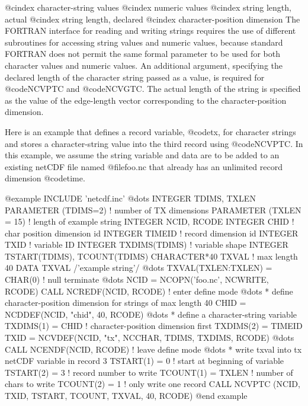 @cindex character-string values
@cindex numeric values
@cindex string length, actual
@cindex string length, declared
@cindex character-position dimension
The FORTRAN interface for reading and writing strings requires the use
of different subroutines for accessing string values and numeric values,
because standard FORTRAN does not permit the same formal parameter to be
used for both character values and numeric values.  An additional
argument, specifying the declared length of the character string passed
as a value, is required for @code{NCVPTC} and @code{NCVGTC}.  The actual
length of the string is specified as the value of the
edge-length vector corresponding to the character-position dimension.

Here is an example that defines a record variable, @code{tx}, for
character strings and stores a character-string value into the third
record using @code{NCVPTC}.  In this example, we assume the string
variable and data are to be added to an existing netCDF file named
@file{foo.nc} that already has an unlimited record dimension
@code{time}.

@example
      INCLUDE 'netcdf.inc'
         @dots{}
      INTEGER   TDIMS, TXLEN
      PARAMETER (TDIMS=2)    ! number of TX dimensions
      PARAMETER (TXLEN = 15) ! length of example string
      INTEGER  NCID, RCODE
      INTEGER  CHID          ! char position dimension id
      INTEGER  TIMEID        ! record dimension id
      INTEGER  TXID          ! variable ID
      INTEGER  TXDIMS(TDIMS) ! variable shape
      INTEGER  TSTART(TDIMS), TCOUNT(TDIMS)
      CHARACTER*40 TXVAL     ! max length 40
      DATA TXVAL /'example string'/
         @dots{}
      TXVAL(TXLEN:TXLEN) = CHAR(0)   ! null terminate
         @dots{}
      NCID = NCOPN('foo.nc', NCWRITE, RCODE)
      CALL NCREDF(NCID, RCODE) ! enter define mode
         @dots{}
* define character-position dimension for strings of max length 40
      CHID = NCDDEF(NCID, "chid", 40, RCODE)
         @dots{}
* define a character-string variable
      TXDIMS(1) = CHID   ! character-position dimension first
      TXDIMS(2) = TIMEID
      TXID = NCVDEF(NCID, "tx", NCCHAR, TDIMS, TXDIMS, RCODE)
         @dots{}
      CALL NCENDF(NCID, RCODE) ! leave define mode
         @dots{}
* write txval into tx netCDF variable in record 3
      TSTART(1) = 0      ! start at beginning of variable
      TSTART(2) = 3      ! record number to write
      TCOUNT(1) = TXLEN  ! number of chars to write
      TCOUNT(2) = 1      ! only write one record
      CALL NCVPTC (NCID, TXID, TSTART, TCOUNT, TXVAL, 40, RCODE)
@end example

